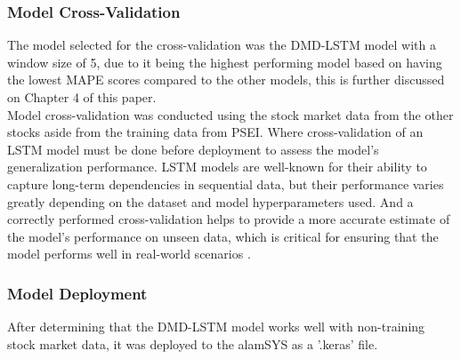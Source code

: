 \subsubsection{Model Cross-Validation}
\label{subsubsec:model_cross_validation}
The model selected for the cross-validation was the DMD-LSTM model with a window size of 5, due to it
being the highest performing model based on having the lowest MAPE scores compared to the other models,
this is further discussed on Chapter 4 of this paper. 
\hfill \\

Model cross-validation was conducted using the stock market data from the other stocks aside from the
training data from PSEI. Where cross-validation of an LSTM model must be done before deployment 
to assess the model's generalization performance. LSTM models are well-known for their ability 
to capture long-term dependencies in sequential data, but their performance varies greatly depending 
on the dataset and model hyperparameters used. And a correctly performed cross-validation helps to 
provide a more accurate estimate of the model's performance on unseen data, which is critical 
for ensuring that the model performs well in real-world scenarios
\cite{Mellema2020, DBLP:journals/corr/abs-1908-06272}.

\subsubsection{Model Deployment}
\label{subsubsec:model_deployment}
After determining that the DMD-LSTM model works well with non-training stock market data, 
it was deployed to the alamSYS as a '.keras' file.
